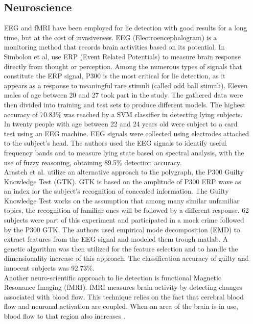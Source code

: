 \subsection*{Neuroscience}
EEG and fMRI have been employed for lie detection with good results for a long time, but at the cost of invasiveness.
EEG (Electroencephalogram) is a monitoring method that records brain activities based on its potential. 
In \cite{7440177} Simbolon et al, use ERP (Event Related Potentials) to measure brain response directly from thought or perception. Among the numerous types of signals that constitute the ERP signal, P300 is the most critical for lie detection, as it appears as a response to meaningful rare stimuli (called odd ball stimuli). Eleven males of age between 20 and 27 took part in the study. The gathered data were then divided into training and test sets to produce different models. The highest accuracy of 70.83\% was reached by a SVM classifier in detecting lying subjects.\\
In \cite{Lai2017} twenty people with age between 22 and 24 years old were subject to a card test using an EEG machine. EEG signals were collected using electrodes attached to the subject’s head. The authors used the EEG signals to identify useful frequency bands and to measure lying state based on spectral analysis, with the use of fuzzy reasoning, obtaining 89.5\% detection accuracy. \\
Arasteh et al. \cite{7511728} utilize an alternative approach to the polygraph, the P300 Guilty Knowledge Test (GTK). GTK is based on the amplitude of P300 ERP wave as an index for the subject's recognition of concealed information. The Guilty Knowledge Test works on the assumption that among many similar unfamiliar topics, the recognition of familiar ones will be followed by a different response. 62 subjects were part of this experiment and participated in a mock crime followed by the P300 GTK. The authors used empirical mode decomposition (EMD) to extract features from the EEG signal and modeled them trough matlab. A genetic algorithm was then utilized for the feature selection and to handle the dimensionality increase of this approach. The classification accuracy of guilty and innocent subjects was 92.73\%. \\
Another neuro-scientific approach to lie detection is functional Magnetic Resonance Imaging (fMRI). fMRI measures brain activity by detecting changes associated with blood flow. This technique relies on the fact that cerebral blood flow and neuronal activation are coupled. When an area of the brain is in use, blood flow to that region also increases \cite{WikifMRI}.\\
